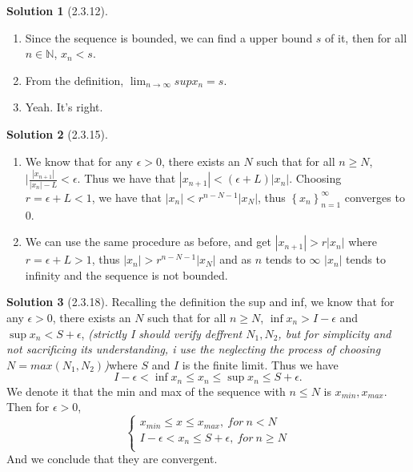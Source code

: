 \documentclass{article}
\theoremstyle{definition}
\newtheorem{sol}{Solution}[exe]
\begin{document}
\begin{sol}[2.3.12]
\begin{enumerate}[label=\alph*]
\item Since the sequence is bounded, we can find a upper bound $s$ of it, then for all $n\in\mathbb{N}$, $x_{n}<s$.
\item From the definition, $\lim_{n\to\infty}sup x_{n}=s$.
\item Yeah. It's right.
\end{enumerate}
\end{sol}


\begin{sol}[2.3.15]
\begin{enumerate}[label=\alph*]
\item We know that for any $\epsilon>0$, there exists an $N$ such that for all $n\geq N$, $|\frac{|x_{n+1}|}{|x_{n}|-L}<\epsilon$.
Thus we have that $|x_{n+1}|<(\epsilon+L)|x_{n}|$. Choosing $r=\epsilon+L<1$, we have that $|x_{n}|<r^{n-N-1}|x_{N}|$, thus $\left\{x_{n}\right\}_{n=1}^{\infty}$ converges to 0.
\item We can use the same procedure as before, and get $|x_{n+1}|>r|x_{n}|$ where $r=\epsilon+L>1$, thus $|x_{n}|>r^{n-N-1}|x_{N}|$ and as $n$ tends to $\infty$ $|x_{n}|$ tends to infinity and the sequence is not bounded.
\end{enumerate}    
\end{sol}


\begin{sol}[2.3.18]

Recalling the definition the sup and inf, we know that for any $\epsilon>0$, there exists an $N$ such that for all $n\geq N$, $\inf x_{n}> I-\epsilon$ and $\sup x_{n}< S+\epsilon$, \textit{(strictly I should verify deffrent $N_{1},N_{2}$, but for simplicity and not sacrificing its understanding, i use the neglecting the process of choosing $N=max(N_{1},N_{2})$)}where $S$ and $I$ is the finite limit.
Thus we have $$ I-\epsilon<\inf x_{n}\leq x_{n}\leq \sup x_{n}\leq S+\epsilon.$$
We denote it that the min and max of the sequence with $n\leq N$ is $x_{min},x_{max}$. Then for $\epsilon>0$, 
$$
\begin{cases}
    x_{min}\leq x\leq x_{max},\ for\ n< N\\
    I-\epsilon<x_{n}\leq S+\epsilon,\ for\ n\geq N\\
\end{cases}
$$
And we conclude that they are convergent.
\end{sol}
\end{document}
